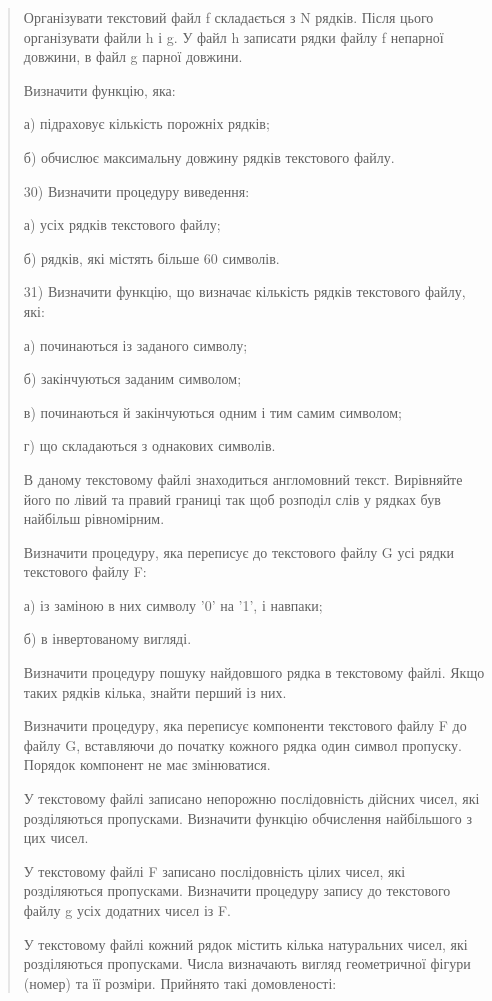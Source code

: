 \documentclass[]{article}
\begin{document}
\begin{quote}
Організувати текстовий файл f складається з N рядків. Після цього
організувати файли h і g. У файл h записати рядки файлу f непарної
довжини, в файл g парної довжини.

Визначити функцію, яка:

а) підраховує кількість порожніх рядків;

б) обчислює максимальну довжину рядків текстового файлу.

30) Визначити процедуру виведення:

а) усіх рядків текстового файлу;

б) рядків, які містять більше 60 символів.

31) Визначити функцію, що визначає кількість рядків текстового файлу,
які:

а) починаються із заданого символу;

б) закінчуються заданим символом;

в) починаються й закінчуються одним і тим самим символом;

г) що складаються з однакових символів.

В даному текстовому файлі знаходиться англомовний текст. Вирівняйте його
по лівий та правий границі так щоб розподіл слів у рядках був найбільш
рівномірним.

Визначити процедуру, яка переписує до текстового файлу G усі рядки
текстового файлу F:

а) із заміною в них символу '0' на '1', і навпаки;

б) в інвертованому вигляді.

Визначити процедуру пошуку найдовшого рядка в текстовому файлі. Якщо
таких рядків кілька, знайти перший із них.

Визначити процедуру, яка переписує компоненти текстового файлу F до
файлу G, вставляючи до початку кожного рядка один символ пропуску.
Порядок компонент не має змінюватися.

У текстовому файлі записано непорожню послідовність дійсних чисел, які
розділяються пропусками. Визначити функцію обчислення найбільшого з цих
чисел.

У текстовому файлі F записано послідовність цілих чисел, які
розділяються пропусками. Визначити процедуру запису до текстового файлу
g усіх додатних чисел із F.

У текстовому файлі кожний рядок містить кілька натуральних чисел, які
розділяються пропусками. Числа визначають вигляд геометричної фігури
(номер) та її розміри. Прийнято такі домовленості:


\end{quote}
\end{document}

